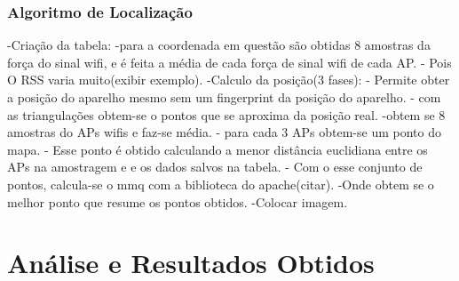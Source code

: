   \subsubsection{Algoritmo de Localização}
  -Criação da tabela:
    -para a coordenada em questão são obtidas 8 amostras da força do sinal wifi, e é feita a 
    média de cada força  de sinal wifi de cada AP.
	- Pois O RSS varia muito(exibir exemplo).
  -Calculo da posição(3 fases):
    - Permite obter a posição do aparelho mesmo sem um fingerprint da posição do aparelho.
	- com as triangulações obtem-se o pontos que se aproxima da posição real.
    -obtem se 8 amostras do APs wifis e faz-se média.
    - para cada 3 APs obtem-se um ponto do mapa.
	- Esse ponto é obtido calculando a menor distância euclidiana entre os APs na amostragem e 
	e os dados salvos na tabela.
    - Com o esse conjunto de pontos, calcula-se o mmq com a biblioteca do apache(citar).
      -Onde obtem se o melhor ponto que resume os pontos obtidos.
    -Colocar imagem.
\section{Análise e Resultados Obtidos}

